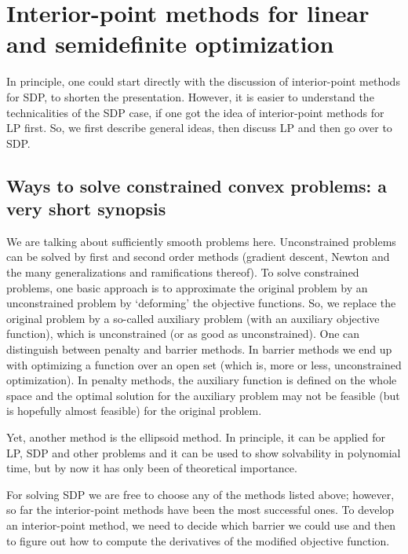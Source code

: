 \section{Interior-point methods for linear and semidefinite optimization} 

In principle, one could start directly with the discussion of interior-point methods for SDP, to shorten the presentation. However, it is easier to understand the technicalities of the SDP case, if one got the idea of interior-point methods for LP first. So, we first describe general ideas, then discuss LP and then go over to SDP.

\subsection{Ways to solve constrained convex problems: a very short synopsis}

We are talking about sufficiently smooth problems here. %
Unconstrained problems can be solved by first and second order methods (gradient descent, Newton and the many generalizations and ramifications thereof). To solve constrained problems, one basic approach is to approximate the original problem by an unconstrained problem by `deforming' the objective functions. So, we replace the original problem by a so-called auxiliary problem (with an auxiliary objective function), which is unconstrained (or as good as unconstrained).  One can distinguish between penalty and barrier methods. In barrier methods we end up with optimizing a function over an open set (which is, more or less, unconstrained optimization). In penalty methods, the auxiliary function is defined on the whole space and the optimal solution for the auxiliary problem may not be feasible (but is hopefully almost feasible) for the original problem.

Yet, another method is the ellipsoid method. In principle, it can be applied for LP, SDP and other problems and it can be used to show solvability in polynomial time, but by now it has only been of theoretical importance.

For solving SDP we are free to choose any of the methods listed above; however, so far the interior-point methods have been the most successful ones. To develop an interior-point method, we need to decide which barrier we could use and then to figure out how to compute the derivatives of the modified objective function. 

